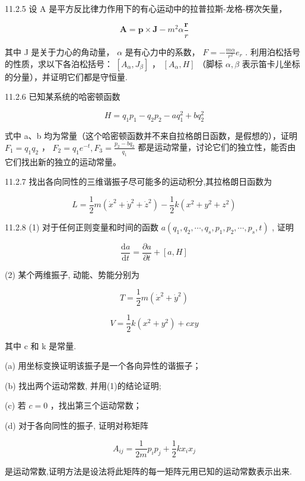 \begin{problem}{11.2.5}
设 A 是平方反比律力作用下的有心运动中的拉普拉斯-龙格-楞次矢量，

\[
\boldsymbol {A} = \boldsymbol {p} \times \boldsymbol {J} - m ^ {2} \alpha \frac {\boldsymbol {r}}{r}
\]

其中 J 是关于力心的角动量， $\alpha$ 是有心力中的系数， $F = -\frac{m\alpha}{r^{2}}e_{r}$ . 利用泊松括号的性质，求以下各泊松括号： $[A_{\alpha}, J_{\beta}]$ ， $[A_{\alpha}, H]$ （脚标 $\alpha, \beta$ 表示笛卡儿坐标的分量），并证明它们都是守恒量.
\end{problem}
\clearpage


\begin{problem}{11.2.6}
已知某系统的哈密顿函数

\[
H = q _ {1} p _ {1} - q _ {2} p _ {2} - a q _ {1} ^ {2} + b q _ {2} ^ {2}
\]

式中 a、b 均为常量（这个哈密顿函数并不来自拉格朗日函数，是假想的），证明 $F_{1}=q_{1}q_{2}$ ， $F_{2}=q_{1}e^{-t}, F_{3}=\frac{p_{2}-bq_{2}}{q_{1}}$ 都是运动常量，讨论它们的独立性，能否由它们找出新的独立的运动常量。
\end{problem}
\clearpage


\begin{problem}{11.2.7}
找出各向同性的三维谐振子尽可能多的运动积分,其拉格朗日函数为

\[
L = \frac {1}{2} m \left(\dot {x} ^ {2} + \dot {y} ^ {2} + \dot {z} ^ {2}\right) - \frac {1}{2} k \left(x ^ {2} + y ^ {2} + z ^ {2}\right)
\]
\end{problem}
\clearpage


\begin{problem}{11.2.8}
(1) 对于任何正则变量和时间的函数 $a(q_{1}, q_{2}, \cdots, q_{s}, p_{1}, p_{2}, \cdots, p_{s}, t)$ , 证明

\[
\frac {\mathrm{d} a}{\mathrm{d} t} = \frac {\partial a}{\partial t} + [ a, H ]
\]

(2) 某个两维振子, 动能、势能分别为

\[
T = \frac {1}{2} m (\dot {x} ^ {2} + \dot {y} ^ {2})
\]

\[
V = \frac {1}{2} k (x ^ {2} + y ^ {2}) + c x y
\]

其中 c 和 k 是常量.

(a) 用坐标变换证明该振子是一个各向异性的谐振子；

(b) 找出两个运动常数, 并用(1)的结论证明;

(c) 若 $c = 0$ ，找出第三个运动常数；

(d) 对于各向同性的振子, 证明对称矩阵

\[
A _ {i j} = \frac {1}{2 m} p _ {i} p _ {j} + \frac {1}{2} k x _ {i} x _ {j}
\]

是运动常数,证明方法是设法将此矩阵的每一矩阵元用已知的运动常数表示出来.
\end{problem}
\clearpage


